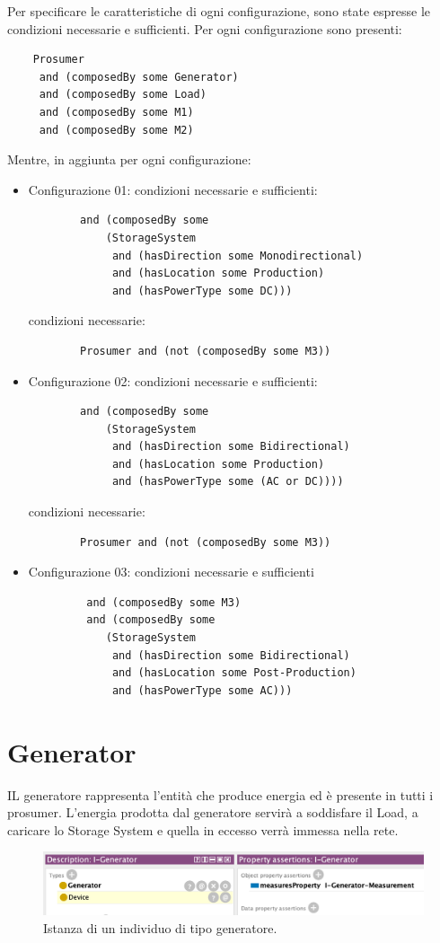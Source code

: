 Per specificare le caratteristiche di ogni configurazione, sono state espresse le condizioni necessarie e sufficienti. Per ogni configurazione sono presenti:
\begin{verbatim}
    Prosumer 
     and (composedBy some Generator) 
     and (composedBy some Load) 
     and (composedBy some M1) 
     and (composedBy some M2) 
\end{verbatim}

Mentre, in aggiunta per ogni configurazione:
\begin{itemize}
    \item Configurazione 01: condizioni necessarie e sufficienti: \begin{verbatim}
        and (composedBy some 
            (StorageSystem 
             and (hasDirection some Monodirectional) 
             and (hasLocation some Production) 
             and (hasPowerType some DC)))
    \end{verbatim}
          condizioni necessarie: \begin{verbatim}
        Prosumer and (not (composedBy some M3))
    \end{verbatim}
    \item Configurazione 02: condizioni necessarie e sufficienti: \begin{verbatim}
        and (composedBy some 
            (StorageSystem 
             and (hasDirection some Bidirectional) 
             and (hasLocation some Production) 
             and (hasPowerType some (AC or DC))))
    \end{verbatim}
          condizioni necessarie: \begin{verbatim}
        Prosumer and (not (composedBy some M3))
    \end{verbatim}
    \item Configurazione 03: condizioni necessarie e sufficienti \begin{verbatim}
         and (composedBy some M3) 
         and (composedBy some 
            (StorageSystem 
             and (hasDirection some Bidirectional) 
             and (hasLocation some Post-Production)
             and (hasPowerType some AC)))
    \end{verbatim}
\end{itemize}


\section{Generator}
IL generatore rappresenta l'entità che produce energia ed è presente in tutti i prosumer.
L'energia prodotta dal generatore servirà a soddisfare il Load, a caricare lo Storage System e quella in eccesso verrà immessa nella rete.
\begin{figure}[H]
    \centering
    \includegraphics[width=12cm]{images/individual_generator.png}
    \caption{Istanza di un individuo di tipo generatore.}
    \label{fig:individual_generator}
\end{figure}

